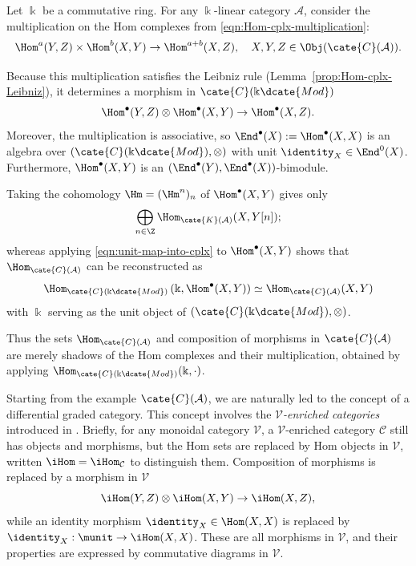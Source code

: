 \begin{example}\label{eg:k-linear-A-enrich}
	Let $\Bbbk$ be a commutative ring. For any $\Bbbk$-linear category
	$\mathcal{A}$, consider the multiplication on the Hom complexes from
	\eqref{eqn:Hom-cplx-multiplication}:
	\[ \Hom^a(Y, Z) \times \Hom^b(X, Y) \to \Hom^{a+b}(X, Z), \quad X, Y, Z \in \Obj(\cate{C}(\mathcal{A})). \]

	Because this multiplication satisfies the Leibniz rule
	(Lemma~\ref{prop:Hom-cplx-Leibniz}), it determines a morphism in
	$\cate{C}(\Bbbk\dcate{Mod})$
	\[ \Hom^\bullet(Y, Z) \otimes \Hom^\bullet(X, Y) \to \Hom^\bullet(X, Z). \]
	Moreover, the multiplication is associative, so
	$\End^\bullet(X):=\Hom^\bullet(X,X)$ is an algebra over
	$(\cate{C}(\Bbbk\dcate{Mod}),\otimes)$ with unit
	$\identity_X\in\End^0(X)$. Furthermore, $\Hom^\bullet(X,Y)$ is an
	$(\End^\bullet(Y),\End^\bullet(X))$-bimodule.

	Taking the cohomology $\Hm=(\Hm^n)_n$ of $\Hom^\bullet(X,Y)$ gives only
	\[ \bigoplus_{n \in \Z} \Hom_{\cate{K}(\mathcal{A})}(X, Y[n]); \]
	whereas applying \eqref{eqn:unit-map-into-cplx} to
	$\Hom^\bullet(X,Y)$ shows that $\Hom_{\cate{C}(\mathcal{A})}$ can be
	reconstructed as
	\[ \Hom_{\cate{C}(\Bbbk\dcate{Mod})}\left( \Bbbk, \Hom^\bullet(X, Y) \right) \simeq \Hom_{\cate{C}(\mathcal{A})}(X, Y)  \]
	with $\Bbbk$ serving as the unit object of
	$(\cate{C}(\Bbbk\dcate{Mod}),\otimes)$.
\end{example}

Thus the sets $\Hom_{\cate{C}(\mathcal{A})}$ and composition of morphisms in
$\cate{C}(\mathcal{A})$ are merely shadows of the Hom complexes and their
multiplication, obtained by applying
$\Hom_{\cate{C}(\Bbbk\dcate{Mod})}(\Bbbk,\mathord\cdot)$.

Starting from the example $\cate{C}(\mathcal{A})$, we are naturally led to
the concept of a differential graded category. This concept involves the
\emph{$\mathcal{V}$-enriched categories} introduced in
\cite[Definition 3.4.1]{Li1}. Briefly, for any monoidal category
$\mathcal{V}$, a $\mathcal{V}$-enriched category $\mathcal{C}$ still has
objects and morphisms, but the Hom sets are replaced by Hom objects in
$\mathcal{V}$, written $\iHom=\iHom_{\mathcal{C}}$ to distinguish them.
Composition of morphisms is replaced by a morphism in $\mathcal{V}$
\[ \iHom(Y, Z) \otimes \iHom(X, Y) \to \iHom(X, Z), \]
while an identity morphism $\identity_X\in\Hom(X,X)$ is replaced by
$\identity_X:\munit\to\iHom(X,X)$. These are all morphisms in $\mathcal{V}$,
and their properties are expressed by commutative diagrams in $\mathcal{V}$.

